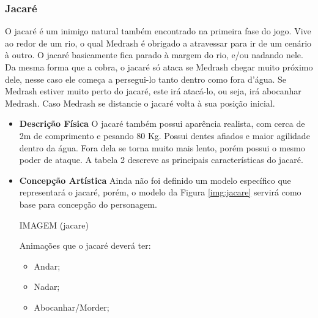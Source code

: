 \subsubsection{Jacaré}
O jacaré é um inimigo natural também encontrado na primeira fase do jogo.
 Vive ao redor de um rio, o qual Medrash é obrigado a atravessar para ir de
 um cenário à outro. O jacaré basicamente fica parado à margem do rio, e/ou
 nadando nele. Da mesma forma que a cobra, o jacaré só ataca se Medrash
 chegar muito próximo dele, nesse caso ele começa a persegui-lo tanto
 dentro como fora d'água. Se Medrash estiver muito perto do jacaré, este
 irá atacá-lo, ou seja, irá abocanhar Medrash. Caso Medrash se distancie o
 jacaré volta à sua posição inicial.
\begin{itemize}
\item {\bf Descrição Física}
O jacaré também possui aparência realista, com cerca de 2m de comprimento e
 pesando 80 Kg. Possui dentes afiados e maior agilidade dentro da água.
 Fora dela se torna muito mais lento, porém possui o mesmo poder de ataque.
 A tabela 2 descreve as principais características do jacaré.

\item {\bf Concepção Artística}
Ainda não foi definido um modelo específico que representará o jacaré,
 porém, o modelo da Figura \ref{img:jacare} servirá como base para concepção do
 personagem.

IMAGEM (jacare)

Animações que o jacaré deverá ter:
\begin{itemize}
\item Andar;
\item Nadar;
\item Abocanhar/Morder;
\end{itemize}
\end{itemize}